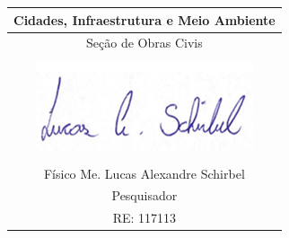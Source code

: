 \begin{table}[b]
  \begin{adjustwidth}{0pt}{-9cm} %
  \centering
  \setlength{\arrayrulewidth}{0.9pt} %
  \begin{tabular}{|c|}
    \hline
    Cidades, Infraestrutura e Meio Ambiente \\
    \hline
    Seção de Obras Civis \\
    \hline \\[1.0pt]
    \includegraphics{./figuras/assinatura.png} \\[5.0pt]
    \hline \\[-25.0pt]
    Físico Me. Lucas Alexandre Schirbel \\[-7.0pt]
    Pesquisador \\[-7.0pt]
    RE: 117113 \\[0.0pt]
    \hline
  \end{tabular}
  \end{adjustwidth}
\end{table}
